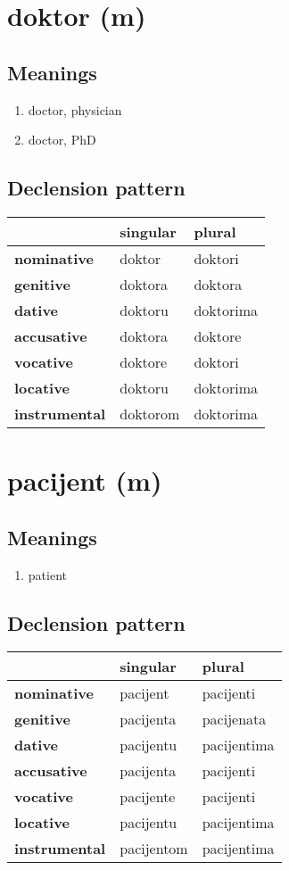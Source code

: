 \filbreak
\section{doktor (m)}
\subsection*{Meanings}
\begin{enumerate}
\item doctor, physician
\item doctor, PhD
\end{enumerate}
\subsection*{Declension pattern}
\begin{tabularx}{\linewidth}{Xll}
\toprule
{} &  singular &     plural \\
\midrule
\textbf{nominative  } &    doktor &    doktori \\
\textbf{genitive    } &   doktora &    doktora \\
\textbf{dative      } &   doktoru &  doktorima \\
\textbf{accusative  } &   doktora &    doktore \\
\textbf{vocative    } &   doktore &    doktori \\
\textbf{locative    } &   doktoru &  doktorima \\
\textbf{instrumental} &  doktorom &  doktorima \\
\bottomrule
\end{tabularx}

\filbreak
\section{pacijent (m)}
\subsection*{Meanings}
\begin{enumerate}
\item patient
\end{enumerate}
\subsection*{Declension pattern}
\begin{tabularx}{\linewidth}{Xll}
\toprule
{} &    singular &       plural \\
\midrule
\textbf{nominative  } &    pacijent &    pacijenti \\
\textbf{genitive    } &   pacijenta &   pacijenata \\
\textbf{dative      } &   pacijentu &  pacijentima \\
\textbf{accusative  } &   pacijenta &    pacijenti \\
\textbf{vocative    } &   pacijente &    pacijenti \\
\textbf{locative    } &   pacijentu &  pacijentima \\
\textbf{instrumental} &  pacijentom &  pacijentima \\
\bottomrule
\end{tabularx}

